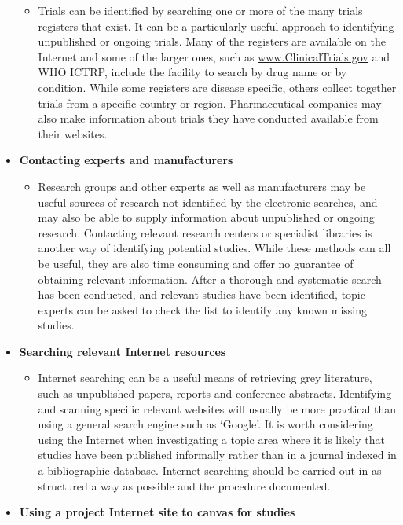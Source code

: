 \documentclass[
  10pt,
  a4paper,
  DIV=11,
  numbers=noendperiod]{scrreprt}
\providecommand{\tightlist}{%
  \setlength{\itemsep}{0pt}\setlength{\parskip}{0pt}}
\begin{document}
\begin{itemize}
  \begin{itemize}
  \tightlist
  \item
    Trials can be identified by searching one or more of the many trials
    registers that exist. It can be a particularly useful approach to
    identifying unpublished or ongoing trials. Many of the registers are
    available on the Internet and some of the larger ones, such as
    \href{http://www.ClinicalTrials.gov/}{www.ClinicalTrials.gov} and
    WHO ICTRP, include the facility to search by drug name or by
    condition. While some registers are disease specific, others collect
    together trials from a specific country or region. Pharmaceutical
    companies may also make information about trials they have conducted
    available from their websites.
  \end{itemize}
\item
  \textbf{Contacting experts and manufacturers}

  \begin{itemize}
  \tightlist
  \item
    Research groups and other experts as well as manufacturers may be
    useful sources of research not identified by the electronic
    searches, and may also be able to supply information about
    unpublished or ongoing research. Contacting relevant research
    centers or specialist libraries is another way of identifying
    potential studies. While these methods can all be useful, they are
    also time consuming and offer no guarantee of obtaining relevant
    information. After a thorough and systematic search has been
    conducted, and relevant studies have been identified, topic experts
    can be asked to check the list to identify any known missing
    studies.
  \end{itemize}
\item
  \textbf{Searching relevant Internet resources}

  \begin{itemize}
  \tightlist
  \item
    Internet searching can be a useful means of retrieving grey
    literature, such as unpublished papers, reports and conference
    abstracts. Identifying and scanning specific relevant websites will
    usually be more practical than using a general search engine such as
    `Google'. It is worth considering using the Internet when
    investigating a topic area where it is likely that studies have been
    published informally rather than in a journal indexed in a
    bibliographic database. Internet searching should be carried out in
    as structured a way as possible and the procedure documented.
  \end{itemize}
\item
  \textbf{Using a project Internet site to canvas for studies}


\end{itemize}
\end{document}
